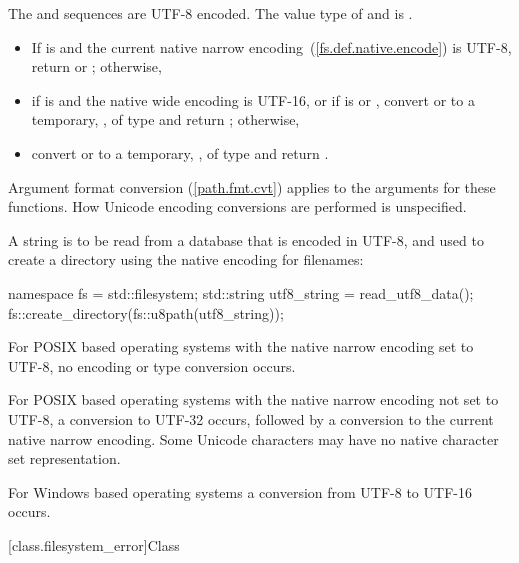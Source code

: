 \begin{itemdescr}
\pnum
\requires The  and 
  sequences are UTF-8 encoded. The value type of 
  and  is .

\pnum
\returns
\begin{itemize}
\item If  is  and the current native
      narrow encoding~(\ref{fs.def.native.encode}) is UTF-8,
      return  or ;
      otherwise,
\item if  is  and the
      native wide encoding is UTF-16, or
      if  is  or ,
      convert  or 
      to a temporary, , of type  and
      return ;
      otherwise,
\item convert  or 
      to a temporary, , of type  and
      return .
\end{itemize}

\pnum
\remarks Argument format conversion (\ref{path.fmt.cvt}) applies to the
  arguments for these functions. How Unicode encoding conversions are performed is
  unspecified.

\pnum
\enterexample
A string is to be read from a database that is encoded in UTF-8, and used
    to create a directory using the native encoding for filenames:
\begin{codeblock}
namespace fs = std::filesystem;
std::string utf8_string = read_utf8_data();
fs::create_directory(fs::u8path(utf8_string));
\end{codeblock}

\pnum
For POSIX based operating systems with the native narrow encoding set
    to UTF-8, no encoding or type conversion occurs.

\pnum
For POSIX based operating systems with the native narrow encoding not
    set to UTF-8, a conversion to UTF-32 occurs, followed by a conversion to the
    current native narrow encoding. Some Unicode characters may have no native character
    set representation.

\pnum
For Windows based operating systems a conversion from UTF-8 to
    UTF-16 occurs.
\exitexample
\end{itemdescr}


[class.filesystem_error]{Class }

